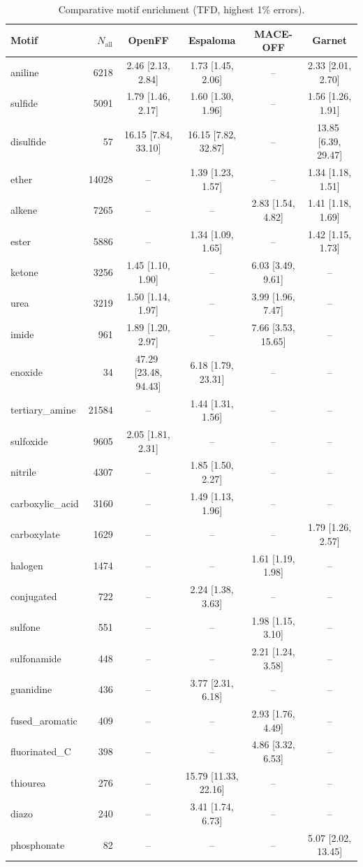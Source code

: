\begin{table}[h!]
  \centering
  \small
  \setlength{\tabcolsep}{5pt}
  \renewcommand{\arraystretch}{1.15}
  \begin{tabular}{l r c c c c}
    \hline
    Motif & $N_\mathrm{all}$ & OpenFF & Espaloma & MACE-OFF & Garnet \\
    \hline
    aniline & 6218 & 2.46\,\,[2.13, 2.84] & 1.73\,\,[1.45, 2.06] & -- & 2.33\,\,[2.01, 2.70] \\
    sulfide & 5091 & 1.79\,\,[1.46, 2.17] & 1.60\,\,[1.30, 1.96] & -- & 1.56\,\,[1.26, 1.91] \\
    disulfide & 57 & 16.15\,\,[7.84, 33.10] & 16.15\,\,[7.82, 32.87] & -- & 13.85\,\,[6.39, 29.47] \\
    \hdashline
    ether & 14028 & -- & 1.39\,\,[1.23, 1.57] & -- & 1.34\,\,[1.18, 1.51] \\
    alkene & 7265 & -- & -- & 2.83\,\,[1.54, 4.82] & 1.41\,\,[1.18, 1.69] \\
    ester & 5886 & -- & 1.34\,\,[1.09, 1.65] & -- & 1.42\,\,[1.15, 1.73] \\
    ketone & 3256 & 1.45\,\,[1.10, 1.90] & -- & 6.03\,\,[3.49, 9.61] & -- \\
    urea & 3219 & 1.50\,\,[1.14, 1.97] & -- & 3.99\,\,[1.96, 7.47] & -- \\
    imide & 961 & 1.89\,\,[1.20, 2.97] & -- & 7.66\,\,[3.53, 15.65] & -- \\
    enoxide & 34 & 47.29\,\,[23.48, 94.43] & 6.18\,\,[1.79, 23.31] & -- & -- \\
    \hdashline
    tertiary\_amine & 21584 & -- & 1.44\,\,[1.31, 1.56] & -- & -- \\
    sulfoxide & 9605 & 2.05\,\,[1.81, 2.31] & -- & -- & -- \\
    nitrile & 4307 & -- & 1.85\,\,[1.50, 2.27] & -- & -- \\
    carboxylic\_acid & 3160 & -- & 1.49\,\,[1.13, 1.96] & -- & -- \\
    carboxylate & 1629 & -- & -- & -- & 1.79\,\,[1.26, 2.57] \\
    halogen & 1474 & -- & -- & 1.61\,\,[1.19, 1.98] & -- \\
    conjugated & 722 & -- & 2.24\,\,[1.38, 3.63] & -- & -- \\
    sulfone & 551 & -- & -- & 1.98\,\,[1.15, 3.10] & -- \\
    sulfonamide & 448 & -- & -- & 2.21\,\,[1.24, 3.58] & -- \\
    guanidine & 436 & -- & 3.77\,\,[2.31, 6.18] & -- & -- \\
    fused\_aromatic & 409 & -- & -- & 2.93\,\,[1.76, 4.49] & -- \\
    fluorinated\_C & 398 & -- & -- & 4.86\,\,[3.32, 6.53] & -- \\
    thiourea & 276 & -- & 15.79\,\,[11.33, 22.16] & -- & -- \\
    diazo & 240 & -- & 3.41\,\,[1.74, 6.73] & -- & -- \\
    phosphonate & 82 & -- & -- & -- & 5.07\,\,[2.02, 13.45] \\
    \hline
  \end{tabular}
  \caption{Comparative motif enrichment (TFD, highest 1\% errors).}
  \label{tab:compare_tfd_worst}
\end{table}